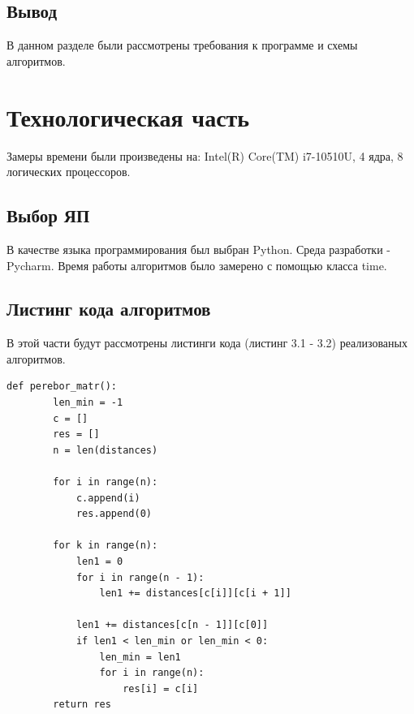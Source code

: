 \documentclass[12pt]{report}
\begin{document}
\newpage
\section*{Вывод}
В данном разделе были рассмотрены требования к программе и схемы алгоритмов.




\chapter{Технологическая часть}
Замеры времени были произведены на: Intel(R) Core(TM) i7-10510U, 4 ядра, 8 логических процессоров.


\section{Выбор ЯП}
В качестве языка программирования был выбран Python. Среда разработки - Pycharm.
Время работы алгоритмов было замерено с помощью класса time. 


\section{Листинг кода алгоритмов}
В этой части будут рассмотрены листинги кода (листинг 3.1 - 3.2) реализованых алгоритмов.
\begin{lstlisting}[label=some-code,caption=Алгоритм поиска полным перебором]
	def perebor_matr():
		len_min = -1
		c = []
		res = []
		n = len(distances)
		
		for i in range(n):
			c.append(i)
			res.append(0)
		
		for k in range(n):
			len1 = 0
			for i in range(n - 1):
				len1 += distances[c[i]][c[i + 1]]
		
			len1 += distances[c[n - 1]][c[0]]
			if len1 < len_min or len_min < 0:
				len_min = len1
				for i in range(n):
					res[i] = c[i]
		return res
	
\end{lstlisting}
\end{document}
